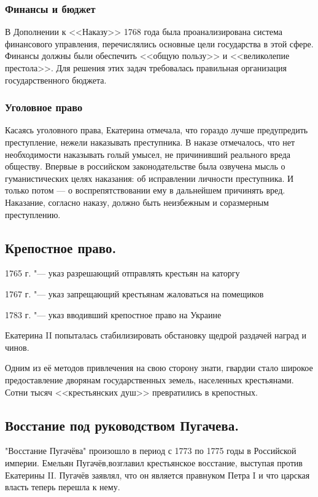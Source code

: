 \subsubsection{Финансы и бюджет}

В Дополнении к <<Наказу>> 1768 года была проанализирована система финансового управления, перечислялись основные цели государства в этой сфере. Финансы должны были обеспечить <<общую пользу>> и <<великолепие престола>>. Для решения этих задач требовалась правильная организация государственного бюджета.

\subsubsection{Уголовное право}

Касаясь уголовного права, Екатерина отмечала, что гораздо лучше предупредить преступление, нежели наказывать преступника. В наказе отмечалось, что нет необходимости наказывать голый умысел, не причинивший реального вреда обществу. Впервые в российском законодательстве была озвучена мысль о гуманистических целях наказания: об исправлении личности преступника. И только потом — о воспрепятствовании ему в дальнейшем причинять вред.  Наказание, согласно наказу, должно быть неизбежным и соразмерным преступлению.

\subsection{Крепостное право.}

1765 г. "--- указ разрешающий отправлять крестьян на каторгу

1767 г. "--- указ запрещающий крестьянам жаловаться на помещиков

1783 г. "--- указ вводивший крепостное право на Украине

Екатерина II попыталась стабилизировать обстановку щедрой раздачей наград и чинов. 

Одним из её методов привлечения на свою сторону знати, гвардии стало широкое предоставление дворянам государственных земель, населенных крестьянами. Сотни тысяч <<крестьянских душ>> превратились в крепостных.

\subsection{Восстание под руководством Пугачева.}

"Восстание Пугачёва" произошло в период с 1773 по 1775 годы в Российской империи. Емельян Пугачёв,возглавил крестьянское восстание, выступая против Екатерины II. Пугачёв заявлял, что он является правнуком Петра I и что царская власть теперь перешла к нему.
 
